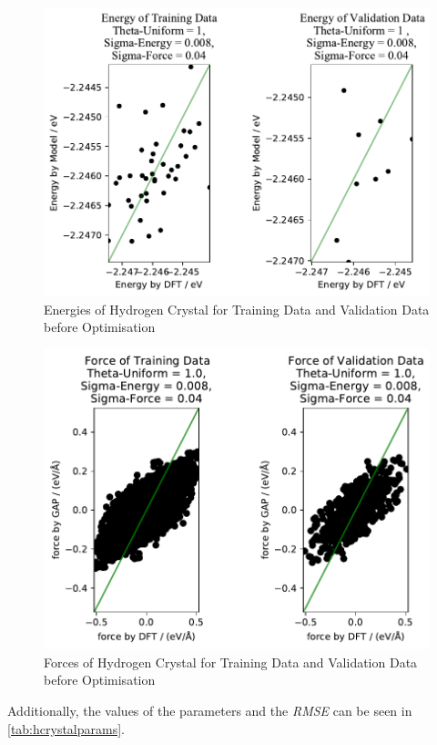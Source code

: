 \begin{figure}
	\includegraphics{../Bilder/Initial_Energies_HCrystal.pdf}
	\caption{Energies of Hydrogen Crystal for Training Data and Validation Data before Optimisation}
	\label{epre_opt_hcrystal}
\end{figure}

\begin{figure}
	\includegraphics{../Bilder/Initial_Forces_HCrystal.pdf}
	\caption{Forces  of Hydrogen Crystal for Training Data and Validation Data before Optimisation}
	\label{fpre_opt_hcrystal}
\end{figure}




Additionally, the values of the parameters and the \textit{RMSE} can be seen in  \ref{tab:hcrystalparams}. 




